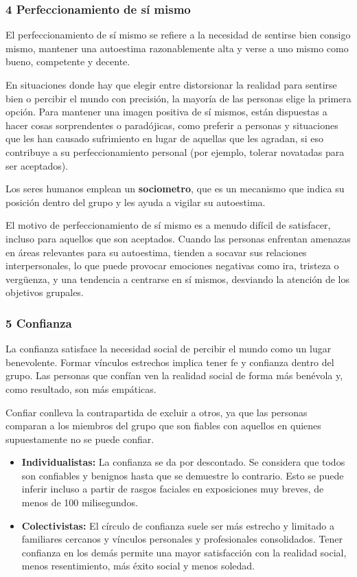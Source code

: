 \documentclass[
]{website}
\begin{document}
\subsubsection*{4 Perfeccionamiento de sí mismo}\label{subtema2_2_4}

El perfeccionamiento de sí mismo se refiere a la necesidad de sentirse bien consigo mismo, mantener una autoestima razonablemente alta y verse a uno mismo como bueno, competente y decente.

En situaciones donde hay que elegir entre distorsionar la realidad para sentirse bien o percibir el mundo con precisión, la mayoría de las personas elige la primera opción. Para mantener una imagen positiva de sí mismos, están dispuestas a hacer cosas sorprendentes o paradójicas, como preferir a personas y situaciones que les han causado sufrimiento en lugar de aquellas que les agradan, si eso contribuye a su perfeccionamiento personal (por ejemplo, tolerar novatadas para ser aceptados).

Los seres humanos emplean un \textbf{sociometro}, que es un mecanismo que indica su posición dentro del grupo y les ayuda a vigilar su autoestima.

El motivo de perfeccionamiento de sí mismo es a menudo difícil de satisfacer, incluso para aquellos que son aceptados. Cuando las personas enfrentan amenazas en áreas relevantes para su autoestima, tienden a socavar sus relaciones interpersonales, lo que puede provocar emociones negativas como ira, tristeza o vergüenza, y una tendencia a centrarse en sí mismos, desviando la atención de los objetivos grupales.

\subsubsection*{5 Confianza}\label{subtema2_2_5}

La confianza satisface la necesidad social de percibir el mundo como un lugar benevolente. Formar vínculos estrechos implica tener fe y confianza dentro del grupo. Las personas que confían ven la realidad social de forma más benévola y, como resultado, son más empáticas.

Confiar conlleva la contrapartida de excluir a otros, ya que las personas comparan a los miembros del grupo que son fiables con aquellos en quienes supuestamente no se puede confiar.

\begin{itemize}
\item
  \textbf{Individualistas:} La confianza se da por descontado. Se considera que todos son confiables y benignos hasta que se demuestre lo contrario. Esto se puede inferir incluso a partir de rasgos faciales en exposiciones muy breves, de menos de 100 milisegundos.
\item
  \textbf{Colectivistas:} El círculo de confianza suele ser más estrecho y limitado a familiares cercanos y vínculos personales y profesionales consolidados. Tener confianza en los demás permite una mayor satisfacción con la realidad social, menos resentimiento, más éxito social y menos soledad.
\end{itemize}
\end{document}
